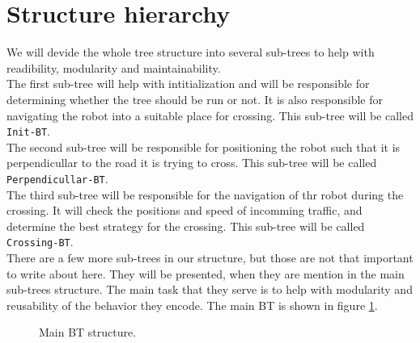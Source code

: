 \section{Structure hierarchy}
    We will devide the whole tree structure into several sub-trees to help with readibility, modularity and maintainability.\\
    The first sub-tree will help with intitialization and will be responsible for determining whether the tree should be run or not. It is also responsible for navigating the robot into a suitable place for crossing. This sub-tree will be called \texttt{Init-BT}.\\
    The second sub-tree will be responsible for positioning the robot such that it is perpendicullar to the road it is trying to cross. This sub-tree will be called \texttt{Perpendicullar-BT}.\\
    The third sub-tree will be responsible for the navigation of thr robot during the crossing. It will check the positions and speed of incomming traffic, and determine the best strategy for the crossing. This sub-tree will be called \texttt{Crossing-BT}.\\
    There are a few more sub-trees in our structure, but those are not that important to write about here. They will be presented, when they are mention in the main sub-trees structure. The main task that they serve is to help with modularity and reusability of the behavior they encode.
    The main BT is shown in figure \ref{fig:main-BT}.
    \begin{figure}[ht]
        \caption{Main BT structure.}
        \label{fig:main-BT}
    \end{figure}


